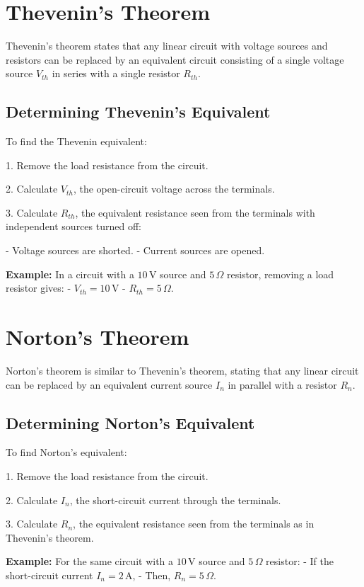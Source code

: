 \documentclass[openany]{book}
\begin{document}
\section{Thevenin's Theorem}
Thevenin's theorem states that any linear circuit with voltage sources and resistors can be replaced by an equivalent circuit consisting of a single voltage source \(V_{th}\) in series with a single resistor \(R_{th}\).

\subsection{Determining Thevenin's Equivalent}
To find the Thevenin equivalent:

1. Remove the load resistance from the circuit.

2. Calculate \(V_{th}\), the open-circuit voltage across the terminals.

3. Calculate \(R_{th}\), the equivalent resistance seen from the terminals with independent sources turned off:

   - Voltage sources are shorted.
   - Current sources are opened.

\textbf{Example:} In a circuit with a \(10 \, \text{V}\) source and \(5 \, \Omega\) resistor, removing a load resistor gives:
- \(V_{th} = 10 \, \text{V}\)
- \(R_{th} = 5 \, \Omega\).

\section{Norton's Theorem}
Norton’s theorem is similar to Thevenin’s theorem, stating that any linear circuit can be replaced by an equivalent current source \(I_n\) in parallel with a resistor \(R_n\).

\subsection{Determining Norton's Equivalent}
To find Norton's equivalent:

1. Remove the load resistance from the circuit.

2. Calculate \(I_n\), the short-circuit current through the terminals.

3. Calculate \(R_n\), the equivalent resistance seen from the terminals as in Thevenin's theorem.


\textbf{Example:} For the same circuit with a \(10 \, \text{V}\) source and \(5 \, \Omega\) resistor:
- If the short-circuit current \(I_n = 2 \, \text{A}\),
- Then, \(R_n = 5 \, \Omega\).
\end{document}
